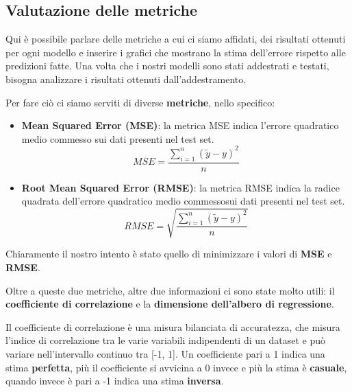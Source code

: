 \documentclass[a4paper, 11pt, oneside]{report}
\begin{document}
                \subsection{Valutazione delle metriche}
                Qui è possibile parlare delle metriche a cui ci siamo affidati, dei risultati ottenuti per ogni modello
                e inserire i grafici che mostrano la stima dell'errore rispetto alle predizioni fatte.
                Una volta che i nostri modelli sono stati addestrati e testati, bisogna analizzare i risultati ottenuti
                dall'addestramento.
                \par \noindent Per fare ciò ci siamo serviti di diverse \textbf{metriche}, nello specifico:
                \begin{itemize}
                    \item \textbf{Mean Squared Error (MSE)}: la metrica MSE indica l'errore quadratico medio commesso
                    sui dati presenti nel test set.
                    \[
                        MSE = \frac{\sum_{i=1}^{n}(\tilde{y} - y)^2}{n}
                    \]
                    \item \textbf{Root Mean Squared Error (RMSE)}: la metrica RMSE indica la radice quadrata dell'errore
                    quadratico medio commessosui dati presenti nel test set.
                    \[
                        RMSE = \sqrt {\frac{\sum_{i=1}^{n}(\tilde{y} - y)^2}{n}}
                    \]
                \end{itemize}
                \par \noindent Chiaramente il nostro intento è stato quello di minimizzare i valori di \textbf{MSE} e
                \textbf{RMSE}.
                \par \noindent
                \par \noindent Oltre a queste due metriche, altre due informazioni ci sono state molto utili: il \textbf{coefficiente
                di correlazione} e la \textbf{dimensione dell'albero di regressione}.
                \par \noindent Il coefficiente di correlazione è una misura bilanciata di accuratezza, che misura l'indice
                di correlazione tra le varie variabili indipendenti di un dataset e può variare nell'intervallo continuo tra [-1, 1].
                Un coefficiente pari a 1 indica una stima \textbf{perfetta}, più il coefficiente si avvicina a 0 invece e più la
                stima è \textbf{casuale}, quando invece è pari a -1 indica una stima \textbf{inversa}.
\end{document}
